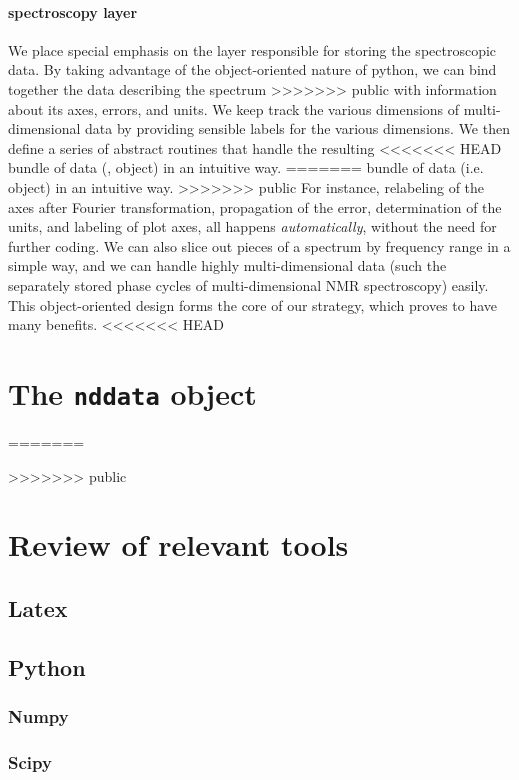 \paragraph{spectroscopy layer}
We place special emphasis on the layer responsible for
    storing the spectroscopic data.
By taking advantage of the object-oriented nature of python,
    we can bind together the data describing the spectrum
>>>>>>> public
    with information about its axes, errors, and units.
We keep track the various dimensions of multi-dimensional data
    by providing sensible labels for the various dimensions.
We then define a series of abstract routines that handle the resulting
<<<<<<< HEAD
    bundle of data (\ie, object) in an intuitive way.
=======
    bundle of data (i.e. object) in an intuitive way.
>>>>>>> public
For instance, relabeling of the axes after Fourier transformation,
    propagation of the error,
    determination of the units,
    and labeling of plot axes,
    all happens {\it automatically},
    without the need for further coding.
We can also slice out pieces of a spectrum by frequency range in a simple way,
    and we can handle highly multi-dimensional data
    (such the separately stored phase cycles of multi-dimensional NMR spectroscopy)
    easily.
This object-oriented design forms the core of our strategy,
    which proves to have many benefits.
<<<<<<< HEAD
\section{The \texttt{nddata} object}

=======

>>>>>>> public
\section{Review of relevant tools}
\subsection{Latex}
\subsection{Python}
\subsubsection{Numpy}
\subsubsection{Scipy}
